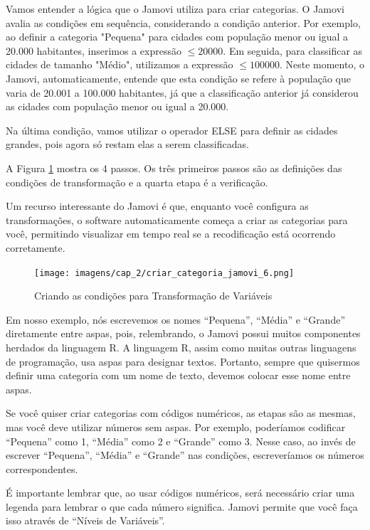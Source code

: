 Vamos entender a lógica que o Jamovi utiliza para criar categorias. O Jamovi avalia as condições em sequência, considerando a condição anterior.  Por exemplo, ao definir a categoria "Pequena" para cidades com população menor ou igual a 20.000 habitantes, inserimos a expressão $\leqslant 20000$. Em seguida, para classificar as cidades de tamanho "Médio", utilizamos a expressão $\leqslant 100000$. Neste momento, o Jamovi, automaticamente, entende que esta condição se refere à população que varia de 20.001 a 100.000 habitantes, já que a classificação anterior já considerou as cidades com população menor ou igual a 20.000.

Na última condição, vamos utilizar o operador ELSE para definir as cidades grandes, pois agora só restam elas a serem classificadas. 

A Figura \ref{fig:criar_categoria_jamovi_6} mostra os 4 passos. Os três primeiros passos são as definições das condições de transformação e a quarta etapa é a verificação.

Um recurso interessante do Jamovi é que, enquanto você configura as transformações, o software automaticamente começa a criar as categorias para você, permitindo visualizar em tempo real se a recodificação está ocorrendo corretamente. 

\begin{figure}[H]
    \centering
    \caption{Criando as condições para Transformação de Variáveis}
    \texttt{[image: imagens/cap\_2/criar\_categoria\_jamovi\_6.png]}
    \label{fig:criar_categoria_jamovi_6}
\end{figure}

Em nosso exemplo, nós escrevemos os nomes ``Pequena'', ``Média'' e ``Grande'' diretamente entre aspas, pois, relembrando, o Jamovi possui muitos componentes herdados da linguagem R. A linguagem R, assim como muitas outras linguagens de programação, usa aspas para designar textos. Portanto, sempre que quisermos definir uma categoria com um nome de texto, devemos colocar esse nome entre aspas.

Se você quiser criar categorias com códigos numéricos, as etapas são as mesmas, mas você deve utilizar números sem aspas. Por exemplo, poderíamos codificar ``Pequena'' como 1, ``Média'' como 2 e ``Grande'' como 3. Nesse caso, ao invés de escrever ``Pequena'', ``Média'' e ``Grande'' nas condições, escreveríamos os números correspondentes.

É importante lembrar que, ao usar códigos numéricos, será necessário criar uma legenda para lembrar o que cada número significa. Jamovi permite que você faça isso através de ``Níveis de Variáveis''.

